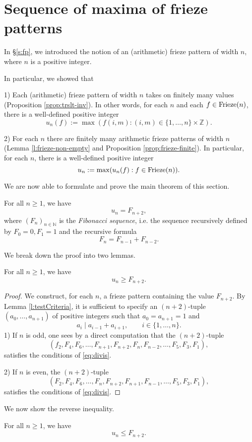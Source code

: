 \chapter{Sequence of maxima of frieze patterns}
In \S \ref{s:fp}, we introduced the notion of an (arithmetic) frieze pattern of width $n$, where $n$ is a positive integer.

In particular, we showed that 

1) Each (arithmetic) frieze pattern of width $n$ takes on finitely many values (Proposition \ref{prop:trslt-inv}). In 
other words, for each $n$ and each $f \in {\rm Frieze}(n)$, there is a well-defined positive integer
\[
    u_n(f) := \max ( f (i,m) : (i,m)  \in \{1,\ldots,n \}\times \mathbb{Z}).
\]

2) For each $n$ there are finitely many arithmetic frieze patterns of width $n$ (Lemma \ref{l:frieze-non-empty} and 
Proposition \ref{prop:frieze-finite}). In particular, for each $n$, there is a well-defined
positive integer 
\[
    u_n := \max (u_n(f) : f \in  {\rm Frieze}(n)).
\]

We are now able to formulate and prove the main theorem of this section.
\begin{theorem}
    \label{MainTheorem}
    For all $n \geq 1$, we have 
    \[
        u_n = F_{n+2},
    \]
    where $(F_{n})_{n \in \mathbb{N}}$ is the {\it Fibonacci sequence}, i.e. the sequence recursively defined by 
    $F_0 = 0, F_1 = 1$ and the recursive formula
    \[
        F_n = F_{n-1} + F_{n-2}.
    \]
\end{theorem}
We break down the proof into two lemmas. 

\begin{lemma}
    \label{l:unLB}
    For all $n \geq 1$, we have 
    \[
        u_n \geq F_{n+2}.
    \]
\end{lemma}
\begin{proof}
    We construct, for each $n$, a frieze pattern containing the value $F_{n+2}$. By Lemma \ref{l:testCriteria}, 
    it is sufficient to specify an $(n+2)$-tuple $(a_0, \ldots, a_{n+1})$ of positive integers such that $a_0 = a_{n+1} =1$ and 
    \begin{equation}\label{eq:divis}
        a_i \mid a_{i-1} + a_{i+1}, \qquad i \in \{1, \ldots, n\}.
    \end{equation}
    1) If $n$ is odd, one sees by a direct computation that the $(n+2)$-tuple 
    \[
        (f_2,F_4, F_6, \ldots, F_{n+1}, F_{n+2}, F_n, F_{n-2}, \ldots, F_5, F_3, F_1), 
    \]
    satisfies the conditions of \eqref{eq:divis}. 

    2) If $n$ is even, the $(n+2)$-tuple 
    \[
        (F_2, F_4, F_6, \ldots, F_n, F_{n+2}, F_{n+1}, F_{n-1}, \ldots, F_5, F_3,F_1),
    \]
    satisfies the conditions of \eqref{eq:divis}. 
\end{proof}

We now show the reverse inequality.
\begin{lemma}
    \label{l:unUB}
    For all $n \geq 1$, we have 
    \[
        u_n \leq F_{n+2}.
    \]
\end{lemma}